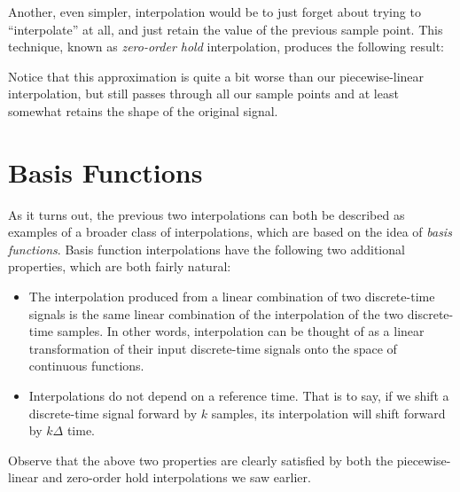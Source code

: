 \documentclass[letterpaper]{article}
\theoremstyle{remark}
\begin{document}
Another, even simpler, interpolation would be to just forget about trying to ``interpolate'' at all, and just retain the value of the previous sample point. This technique, known as \emph{zero-order hold} interpolation, produces the following result:
\begin{center}
\end{center}
Notice that this approximation is quite a bit worse than our piecewise-linear interpolation, but still passes through all our sample points and at least somewhat retains the shape of the original signal.

\section{Basis Functions}
As it turns out, the previous two interpolations can both be described as examples of a broader class of interpolations, which are based on the idea of \emph{basis functions}. Basis function interpolations have the following two additional properties, which are both fairly natural:
\begin{itemize}
    \item The interpolation produced from a linear combination of two discrete-time signals is the same linear combination of the interpolation of the two discrete-time samples. In other words, interpolation can be thought of as a linear transformation of their input discrete-time signals onto the space of continuous functions.
    \item Interpolations do not depend on a reference time. That is to say, if we shift a discrete-time signal forward by $k$ samples, its interpolation will shift forward by $k\Delta$ time.
\end{itemize}
Observe that the above two properties are clearly satisfied by both the piecewise-linear and zero-order hold interpolations we saw earlier.
\end{document}
